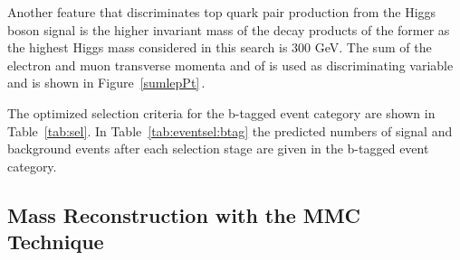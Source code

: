 Another feature that discriminates top quark  pair production from the Higgs boson signal is the higher invariant mass 
of the decay products of the former as the highest Higgs mass considered in this  search is 300 GeV.
The sum of the electron and muon transverse momenta and of  \met is  used as 
discriminating variable and is shown in Figure~\ref{sumlepPt}$\,.$

The optimized selection criteria for the b-tagged event category are shown in Table~\ref{tab:sel}.
In Table~\ref{tab:eventsel:btag} the predicted numbers of signal and background events after each selection stage are given in 
 the b-tagged event category.





\subsection{Mass Reconstruction with the MMC Technique}\label{sec:mmc}

